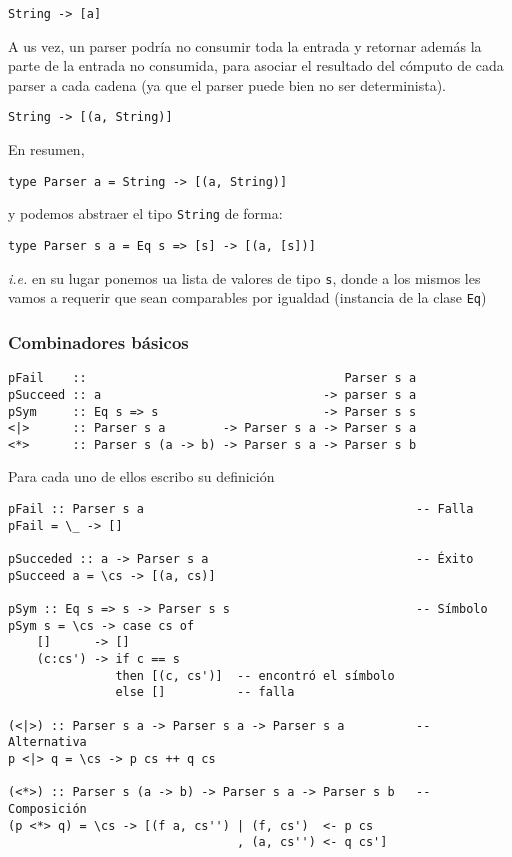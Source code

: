 \documentclass{article}
\newcommand{\imp}[1]{\textcolor{color1}{#1}}
\begin{document}
\begin{lstlisting}
String -> [a]
\end{lstlisting}

A us vez, un parser podría no consumir toda la entrada y retornar además la parte de la entrada no consumida, para asociar el resultado del cómputo de cada parser a cada cadena (ya que el parser puede bien no ser determinista).

\begin{lstlisting}
String -> [(a, String)]
\end{lstlisting}

En resumen, 

\begin{lstlisting}
type Parser a = String -> [(a, String)]
\end{lstlisting}

y podemos abstraer el tipo \imp{\texttt{String}} de forma:

\begin{lstlisting}
type Parser s a = Eq s => [s] -> [(a, [s])]
\end{lstlisting}

\emph{i.e.} en su lugar ponemos ua lista de valores de tipo \imp{\texttt{s}}, donde a los mismos les vamos a requerir que sean comparables por igualdad (instancia de la clase \imp{\texttt{Eq}})

\subsubsection{Combinadores básicos}

\begin{lstlisting}
pFail    ::                                    Parser s a
pSucceed :: a                               -> parser s a
pSym     :: Eq s => s                       -> Parser s s
<|>      :: Parser s a        -> Parser s a -> Parser s a
<*>      :: Parser s (a -> b) -> Parser s a -> Parser s b
\end{lstlisting}

Para cada uno de ellos escribo su definición

\begin{lstlisting}
pFail :: Parser s a                                      -- Falla
pFail = \_ -> []

pSucceded :: a -> Parser s a                             -- Éxito
pSucceed a = \cs -> [(a, cs)]

pSym :: Eq s => s -> Parser s s                          -- Símbolo
pSym s = \cs -> case cs of
    []      -> []
    (c:cs') -> if c == s
               then [(c, cs')]  -- encontró el símbolo
               else []          -- falla

(<|>) :: Parser s a -> Parser s a -> Parser s a          -- Alternativa
p <|> q = \cs -> p cs ++ q cs

(<*>) :: Parser s (a -> b) -> Parser s a -> Parser s b   -- Composición
(p <*> q) = \cs -> [(f a, cs'') | (f, cs')  <- p cs
                                , (a, cs'') <- q cs']
\end{lstlisting}
\end{document}
